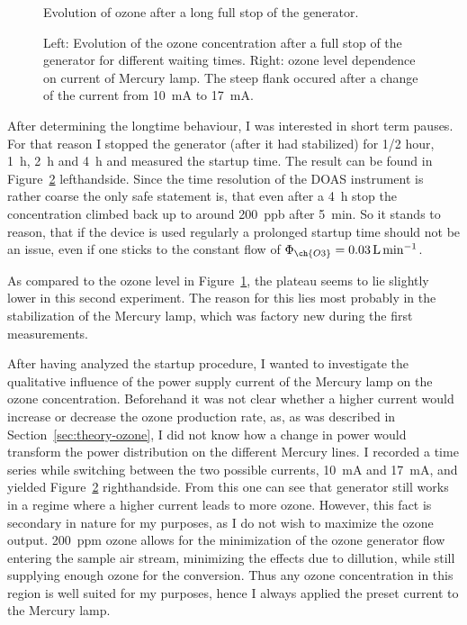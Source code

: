 \begin{figure}[htbp]
  \centering
  
  \caption{Evolution of ozone after a long full stop of the
    generator.}
  \label{fig:long-stop}
\end{figure}
\begin{figure}[htbp]
  \centering
  
  \hfill
  
  \caption{Left: Evolution of the ozone concentration after a full stop of the
    generator for different waiting times. Right: ozone level
    dependence on current of Mercury lamp. The steep
    flank occured after a change of the current from
    \SI{10}{\milli\ampere} to \SI{17}{\milli\ampere}.}
  \label{fig:multiple-stop}
\end{figure}

After determining the longtime behaviour, I was interested in
short term pauses. For that reason I stopped the generator (after it
had stabilized) for {\nfrac{} 1/2} \si{hour}, \SI{1}{\hour},
\SI{2}{\hour} and \SI{4}{\hour} and measured the startup time. The
result can be found in Figure~\ref{fig:multiple-stop}
lefthandside. Since the time resolution of the DOAS instrument is
rather coarse the only safe statement is, that even after a
\SI{4}{\hour} stop the concentration climbed back up to around
\SI{200}{ppb} after \SI{5}{\minute}. So it stands to reason, that if
the device is used regularly a prolonged startup time should not be an
issue, even if one sticks to the constant flow of $\Phi_{\ch{O3}} =
\SI{0.03}{\liter\per\minute}$.

As compared to the ozone level in Figure~\ref{fig:long-stop}, the
plateau seems to lie slightly lower in this second experiment. The
reason for this lies most probably in the stabilization of the Mercury
lamp, which was factory new during the first measurements.

After having analyzed the startup procedure, I wanted to investigate
the qualitative influence of the power supply current of the Mercury
lamp on the ozone concentration. Beforehand it was not clear whether a
higher current would increase or decrease the ozone production rate,
as, as was described in Section~\ref{sec:theory-ozone}, I did not know
how a change in power would transform the power distribution on the
different Mercury lines. I recorded a time series while switching
between the two possible currents, \SI{10}{\milli\ampere} and
\SI{17}{\milli\ampere}, and yielded Figure~\ref{fig:multiple-stop}
righthandside. From this one can see that generator still works in a
regime where a higher current leads to more ozone. However, this fact
is secondary in nature for my purposes, as I do not wish to maximize
the ozone output. \SI{200}{ppm} ozone allows for the minimization of
the ozone generator flow entering the sample air stream, minimizing
the effects due to dillution, while still supplying enough ozone for
the conversion. Thus any ozone concentration in this region is well
suited for my purposes, hence I always applied the preset current to
the Mercury lamp.

